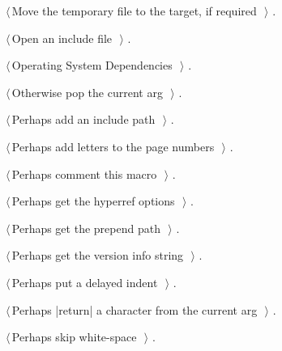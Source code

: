 \documentclass[a4paper]{report}
\begin{document}
{\begin{list}{}{\setlength{\itemsep}{-\parsep}\setlength{\itemindent}{-\leftmargin}}
\item $\langle\,$Move the temporary file to the target, if required\nobreak\ {\footnotesize {}}$\,\rangle$ {\footnotesize {\NWtxtRefIn} .}
\item $\langle\,$Open an include file\nobreak\ {\footnotesize {}}$\,\rangle$ {\footnotesize {\NWtxtRefIn} .}
\item $\langle\,$Operating System Dependencies\nobreak\ {\footnotesize {}}$\,\rangle$ {\footnotesize {\NWtxtRefIn} .
}
\item $\langle\,$Otherwise pop the current arg\nobreak\ {\footnotesize {}}$\,\rangle$ {\footnotesize {\NWtxtRefIn} .}
\item $\langle\,$Perhaps add an include path\nobreak\ {\footnotesize {}}$\,\rangle$ {\footnotesize {\NWtxtRefIn} .}
\item $\langle\,$Perhaps add letters to the page numbers\nobreak\ {\footnotesize {}}$\,\rangle$ {\footnotesize {\NWtxtRefIn} .}
\item $\langle\,$Perhaps comment this macro\nobreak\ {\footnotesize {}}$\,\rangle$ {\footnotesize {\NWtxtRefIn} .
}
\item $\langle\,$Perhaps get the hyperref options\nobreak\ {\footnotesize {}}$\,\rangle$ {\footnotesize {\NWtxtRefIn} .}
\item $\langle\,$Perhaps get the prepend path\nobreak\ {\footnotesize {}}$\,\rangle$ {\footnotesize {\NWtxtRefIn} .}
\item $\langle\,$Perhaps get the version info string\nobreak\ {\footnotesize {}}$\,\rangle$ {\footnotesize {\NWtxtRefIn} .}
\item $\langle\,$Perhaps put a delayed indent\nobreak\ {\footnotesize {}}$\,\rangle$ {\footnotesize {\NWtxtRefIn} .
}
\item $\langle\,$Perhaps |return| a character from the current arg\nobreak\ {\footnotesize {}}$\,\rangle$ {\footnotesize {\NWtxtRefIn} .}
\item $\langle\,$Perhaps skip white-space\nobreak\ {\footnotesize {}}$\,\rangle$ {\footnotesize {\NWtxtRefIn} .}

\end{list}}
\end{document}
